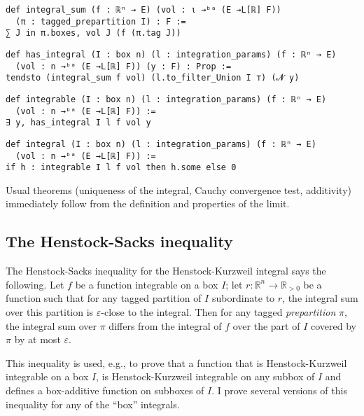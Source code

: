 \documentclass[a4paper,UKenglish,cleveref, autoref, thm-restate]{lipics-v2021}
\newcommand{\bbR}{\mathbb{R}}
\newcommand{\eps}{\varepsilon}
\begin{document}
\begin{lstlisting}[caption={Definition of the Riemann integral sum}]
def integral_sum (f : ℝⁿ → E) (vol : ι →ᵇᵃ (E →L[ℝ] F))
  (π : tagged_prepartition I) : F :=
∑ J in π.boxes, vol J (f (π.tag J))
\end{lstlisting}
\begin{lstlisting}[caption={A predicate saying that $f$ has integral $y$ on $I$}]
def has_integral (I : box n) (l : integration_params) (f : ℝⁿ → E)
  (vol : n →ᵇᵃ (E →L[ℝ] F)) (y : F) : Prop :=
tendsto (integral_sum f vol) (l.to_filter_Union I ⊤) (𝓝 y)
\end{lstlisting}
\begin{lstlisting}[caption={A function is integrable if it has integral $y$ for some $y$}]
def integrable (I : box n) (l : integration_params) (f : ℝⁿ → E)
  (vol : n →ᵇᵃ (E →L[ℝ] F)) :=
∃ y, has_integral I l f vol y
\end{lstlisting}
\begin{lstlisting}[caption={The integral of a function is a vector $y$ such that $f$ has integral $y$ if $f$ is integrable or zero otherwise}]
def integral (I : box n) (l : integration_params) (f : ℝⁿ → E)
  (vol : n →ᵇᵃ (E →L[ℝ] F)) :=
if h : integrable I l f vol then h.some else 0
\end{lstlisting}

Usual theorems (uniqueness of the integral, Cauchy convergence test,
additivity) immediately follow from the definition and properties of
the limit.

\subsection{The Henstock-Sacks inequality}%
\label{sec:henst-sacks-ineq}

The Henstock-Sacks inequality for the Henstock-Kurzweil integral says
the following. Let \(f\) be a function integrable on a box \(I\); let
\(r\colon \bbR^{n} \to \bbR_{>0}\) be a function such that for any
tagged partition of \(I\) subordinate to \(r\), the integral sum over
this partition is \(\eps\)-close to the integral. Then for any tagged
\emph{prepartition} \(\pi\), the integral sum over \(\pi\) differs
from the integral of \(f\) over the part of \(I\) covered by \(\pi\)
by at most \(\eps\).

This inequality is used, e.g., to prove that a function that is
Henstock-Kurzweil integrable on a box \(I\), is Henstock-Kurzweil
integrable on any subbox of \(I\) and defines a box-additive function
on subboxes of \(I\). I prove several versions of this inequality for
any of the \enquote{box} integrals.
\end{document}
